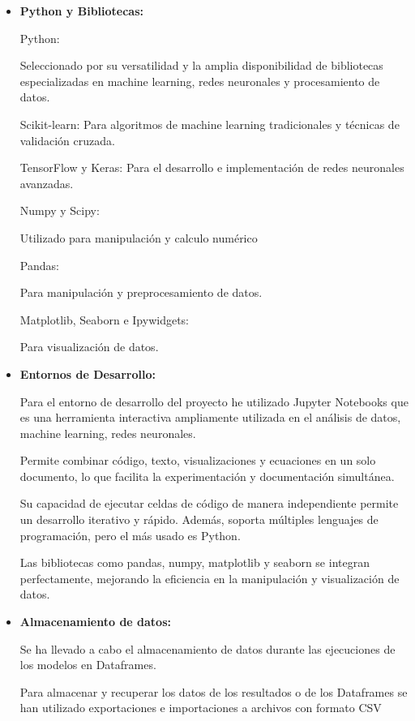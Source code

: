 \begin{itemize}
	
	\item
	\textbf{Python y Bibliotecas:}


Python: 

Seleccionado por su versatilidad y la amplia disponibilidad de bibliotecas especializadas en machine learning, redes neuronales y procesamiento de datos.

Scikit-learn: 
Para algoritmos de machine learning tradicionales y técnicas de validación cruzada.

TensorFlow y Keras: 
Para el desarrollo e implementación de redes neuronales avanzadas.

Numpy y Scipy: 

Utilizado para manipulación y calculo numérico

Pandas: 

Para manipulación y preprocesamiento de datos.

Matplotlib, Seaborn e Ipywidgets: 

Para visualización de datos.

	\item
	\textbf{Entornos de Desarrollo:}

Para el entorno de desarrollo del proyecto he utilizado Jupyter Notebooks que es una herramienta interactiva ampliamente utilizada en el análisis de datos, machine learning, redes neuronales.

Permite combinar código, texto, visualizaciones y ecuaciones en un solo documento, lo que facilita la experimentación y documentación simultánea. 

Su capacidad de ejecutar celdas de código de manera independiente permite un desarrollo iterativo y rápido. Además, soporta múltiples lenguajes de programación, pero el más usado es Python. 

Las bibliotecas como pandas, numpy, matplotlib y seaborn se integran perfectamente, mejorando la eficiencia en la manipulación y visualización de datos.



	\item
	\textbf{Almacenamiento de datos:}

Se ha llevado a cabo el almacenamiento de datos durante las ejecuciones de los modelos en Dataframes.

Para almacenar y recuperar los datos de los resultados o de los Dataframes se han utilizado exportaciones e importaciones a archivos con formato CSV

\end{itemize}	